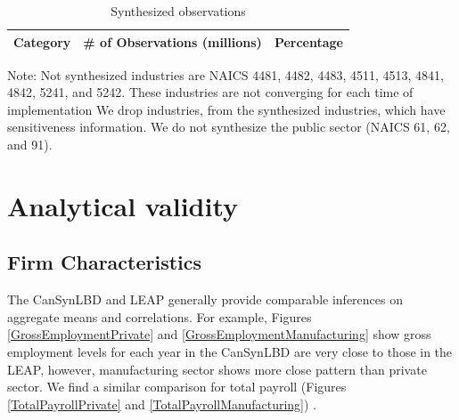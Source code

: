 \documentclass{article}
\begin{document}
\begin{table}[H]
  \centering
\begin{threeparttable}
  \caption{Synthesized observations}  \label{Synthesized_observations} \medskip
  \renewcommand{\arraystretch}{1}
  \begin{tabular}{l  c c }
    \toprule
    \textbf{Category}&\textbf{\# of Observations (millions)}&\textbf{Percentage}\\
    \midrule

   \bottomrule
  \end{tabular} 
\begin{tablenotes}
\small
\item Note: Not synthesized industries are NAICS 4481,    4482,     4483,     4511,     4513,     4841,     4842,     5241, and 5242. These industries are not converging for each time of implementation We drop industries, from the synthesized industries, which have sensitiveness information. We do not synthesize the public sector (NAICS 61, 62, and 91).
 \end{tablenotes}
 \end{threeparttable}
\end{table}

\newpage

\section{Analytical validity}
\subsection{Firm Characteristics}
The CanSynLBD and LEAP generally provide comparable inferences on aggregate means and correlations. For example, Figures \ref{GrossEmploymentPrivate} and \ref{GrossEmploymentManufacturing} show gross employment levels for each year in the CanSynLBD are very close to those in the LEAP, however, manufacturing sector shows more close pattern than private sector. We find a similar comparison for total payroll (Figures \ref{TotalPayrollPrivate} and  \ref{TotalPayrollManufacturing}) .
\end{document}
